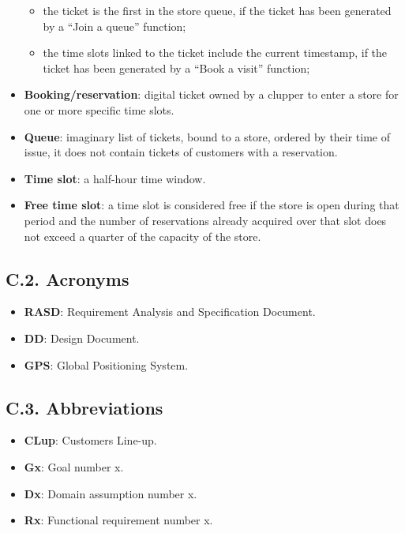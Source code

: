 \begin{itemize}
  \begin{itemize}
  \tightlist
  \item
    the ticket is the first in the store queue, if the ticket has been generated by a ``Join a queue'' function;
  \item
    the time slots linked to the ticket include the current timestamp, if the ticket has been generated by a ``Book a visit'' function;
  \end{itemize}
\item
  \textbf{Booking/reservation}: digital ticket owned by a clupper to enter a store for one or more specific time slots.
\item
  \textbf{Queue}: imaginary list of tickets, bound to a store, ordered by their time of issue, it does not contain tickets of customers with a reservation.
\item
  \textbf{Time slot}: a half-hour time window.
\item
  \textbf{Free time slot}: a time slot is considered free if the store is open during that period and the number of reservations already acquired over that slot does not exceed a quarter of the capacity of the store.
\end{itemize}

\subsection{C.2. Acronyms}

\begin{itemize}
\item
  \textbf{RASD}: Requirement Analysis and Specification Document.
\item
  \textbf{DD}: Design Document.
\item
  \textbf{GPS}: Global Positioning System.
\end{itemize}

\subsection{C.3. Abbreviations}

\begin{itemize}
\item
  \textbf{CLup}: Customers Line-up.
\item
  \textbf{Gx}: Goal number x.
\item
  \textbf{Dx}: Domain assumption number x.
\item
  \textbf{Rx}: Functional requirement number x.
\end{itemize}

